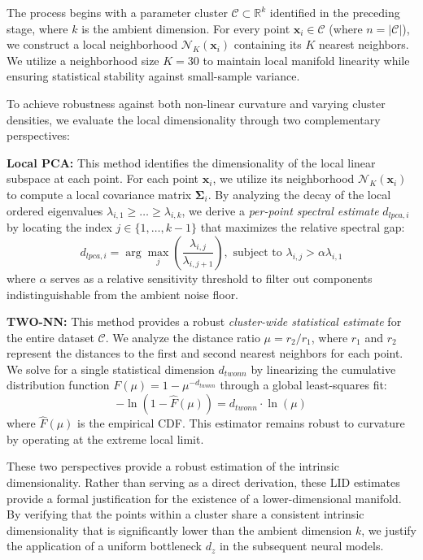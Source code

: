 \documentclass{thesis}
\begin{document}
The process begins with a parameter cluster $\mathcal{C} \subset \mathbb{R}^k$ identified in the preceding stage, where $k$ is the ambient dimension. For every point $\mathbf{x}_i \in \mathcal{C}$ (where $n = |\mathcal{C}|$), we construct a local neighborhood $\mathcal{N}_K(\mathbf{x}_i)$ containing its $K$ nearest neighbors. We utilize a neighborhood size $K=30$ to maintain local manifold linearity while ensuring statistical stability against small-sample variance.

To achieve robustness against both non-linear curvature and varying cluster densities, we evaluate the local dimensionality through two complementary perspectives:

\textbf{Local PCA:} This method identifies the dimensionality of the local linear subspace at each point. For each point $\mathbf{x}_i$, we utilize its neighborhood $\mathcal{N}_K(\mathbf{x}_i)$ to compute a local covariance matrix $\mathbf{\Sigma}_i$. By analyzing the decay of the local ordered eigenvalues $\lambda_{i,1} \ge \dots \ge \lambda_{i,k}$, we derive a \textit{per-point spectral estimate} $d_{lpca, i}$ by locating the index $j \in \{1, \dots, k-1\}$ that maximizes the relative spectral gap:
    \begin{equation}
        d_{lpca, i} = \arg \max_{j} \left( \frac{\lambda_{i,j}}{\lambda_{i,j+1}} \right), \text{ subject to } \lambda_{i,j} > \alpha \lambda_{i,1}
    \end{equation}
    where $\alpha$ serves as a relative sensitivity threshold to filter out components indistinguishable from the ambient noise floor.

\textbf{TWO-NN:} This method provides a robust \textit{cluster-wide statistical estimate} for the entire dataset $\mathcal{C}$. We analyze the distance ratio $\mu = r_2/r_1$, where $r_1$ and $r_2$ represent the distances to the first and second nearest neighbors for each point. We solve for a single statistical dimension $d_{twonn}$ by linearizing the cumulative distribution function $F(\mu) = 1 - \mu^{-d_{twonn}}$ through a global least-squares fit:
    \begin{equation}
        -\ln(1 - \hat{F}(\mu)) = d_{twonn} \cdot \ln(\mu)
    \end{equation}
    where $\hat{F}(\mu)$ is the empirical CDF. This estimator remains robust to curvature by operating at the extreme local limit.

These two perspectives provide a robust estimation of the intrinsic dimensionality. Rather than serving as a direct derivation, these LID estimates provide a formal justification for the existence of a lower-dimensional manifold. By verifying that the points within a cluster share a consistent intrinsic dimensionality that is significantly lower than the ambient dimension $k$, we justify the application of a uniform bottleneck $d_z$ in the subsequent neural models.
\end{document}
